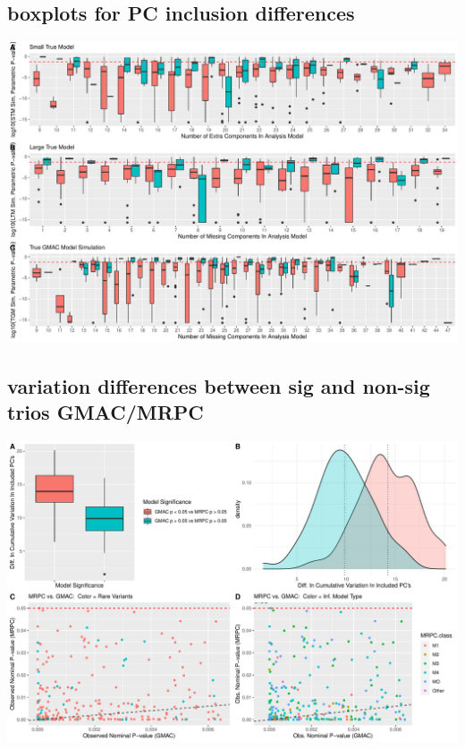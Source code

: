 \documentclass[
]{article}
\begin{document}
\hypertarget{boxplots-for-pc-inclusion-differences}{%
\subsection{boxplots for PC inclusion
differences}\label{boxplots-for-pc-inclusion-differences}}

\includegraphics{GMACwriteup_files/figure-latex/unnamed-chunk-11-1.pdf}

\hypertarget{variation-differences-between-sig-and-non-sig-trios-gmacmrpc}{%
\subsection{variation differences between sig and non-sig trios
GMAC/MRPC}\label{variation-differences-between-sig-and-non-sig-trios-gmacmrpc}}

\includegraphics{GMACwriteup_files/figure-latex/unnamed-chunk-12-1.pdf}
\end{document}

